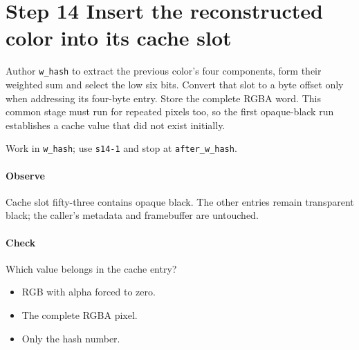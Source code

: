 \section{Step 14 Insert the reconstructed color into its cache slot}\label{qoi-s14}
Author \texttt{w\_hash} to extract the previous color’s four components, form their weighted sum and select the low six bits. Convert that slot to a byte offset only when addressing its four-byte entry. Store the complete RGBA word. This common stage must run for repeated pixels too, so the first opaque-black run establishes a cache value that did not exist initially.

Work in \texttt{w\_hash}; use \texttt{s14-1} and stop at \texttt{after\_w\_hash}.

\paragraph{Observe} Cache slot fifty-three contains opaque black. The other entries remain transparent black; the caller’s metadata and framebuffer are untouched.

\paragraph{Check} Which value belongs in the cache entry?
\begin{itemize}
  \item[A.] RGB with alpha forced to zero.
  \item[B.] The complete RGBA pixel.
  \item[C.] Only the hash number.
\end{itemize}
